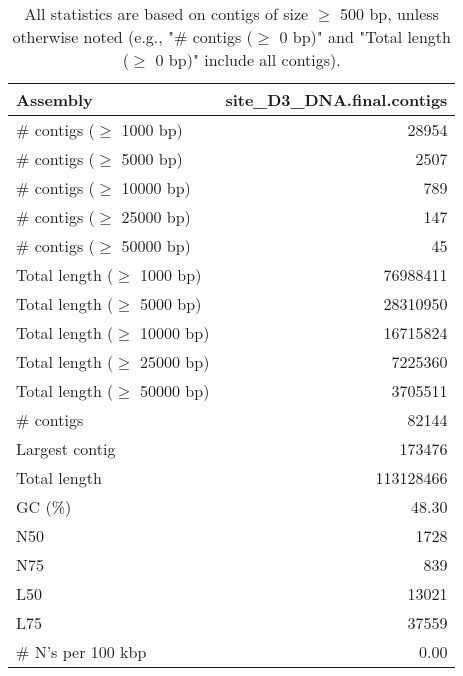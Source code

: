 \documentclass[12pt,a4paper]{article}
\begin{document}
\begin{table}[ht]
\begin{center}
\caption{All statistics are based on contigs of size $\geq$ 500 bp, unless otherwise noted (e.g., "\# contigs ($\geq$ 0 bp)" and "Total length ($\geq$ 0 bp)" include all contigs).}
\begin{tabular}{|l*{1}{|r}|}
\hline
Assembly & site\_D3\_DNA.final.contigs \\ \hline
\# contigs ($\geq$ 1000 bp) & 28954 \\ \hline
\# contigs ($\geq$ 5000 bp) & 2507 \\ \hline
\# contigs ($\geq$ 10000 bp) & 789 \\ \hline
\# contigs ($\geq$ 25000 bp) & 147 \\ \hline
\# contigs ($\geq$ 50000 bp) & 45 \\ \hline
Total length ($\geq$ 1000 bp) & 76988411 \\ \hline
Total length ($\geq$ 5000 bp) & 28310950 \\ \hline
Total length ($\geq$ 10000 bp) & 16715824 \\ \hline
Total length ($\geq$ 25000 bp) & 7225360 \\ \hline
Total length ($\geq$ 50000 bp) & 3705511 \\ \hline
\# contigs & 82144 \\ \hline
Largest contig & 173476 \\ \hline
Total length & 113128466 \\ \hline
GC (\%) & 48.30 \\ \hline
N50 & 1728 \\ \hline
N75 & 839 \\ \hline
L50 & 13021 \\ \hline
L75 & 37559 \\ \hline
\# N's per 100 kbp & 0.00 \\ \hline
\end{tabular}
\end{center}
\end{table}
\end{document}
